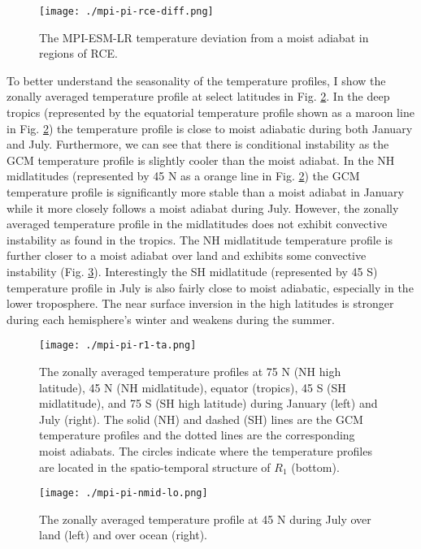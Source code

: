 \documentclass[11pt]{article}
\begin{document}
\begin{figure}[htbp]
\centering
\texttt{[image: ./mpi-pi-rce-diff.png]}
\caption{\label{fig:orgf8b1242}The MPI-ESM-LR temperature deviation from a moist adiabat in regions of RCE.}
\end{figure}

To better understand the seasonality of the temperature profiles, I show the zonally averaged temperature profile at select latitudes in Fig. \ref{fig:orgbce9cd6}. In the deep tropics (represented by the equatorial temperature profile shown as a maroon line in Fig. \ref{fig:orgbce9cd6}) the temperature profile is close to moist adiabatic during both January and July. Furthermore, we can see that there is conditional instability as the GCM temperature profile is slightly cooler than the moist adiabat. In the NH midlatitudes (represented by 45 N as a orange line in Fig. \ref{fig:orgbce9cd6}) the GCM temperature profile is significantly more stable than a moist adiabat in January while it more closely follows a moist adiabat during July. However, the zonally averaged temperature profile in the midlatitudes does not exhibit convective instability as found in the tropics. The NH midlatitude temperature profile is further closer to a moist adiabat over land and exhibits some convective instability (Fig. \ref{fig:org65f7c1f}). Interestingly the SH midlatitude (represented by 45 S) temperature profile in July is also fairly close to moist adiabatic, especially in the lower troposphere. The near surface inversion in the high latitudes is stronger during each hemisphere's winter and weakens during the summer.

\begin{figure}[htbp]
\centering
\texttt{[image: ./mpi-pi-r1-ta.png]}
\caption{\label{fig:orgbce9cd6}The zonally averaged temperature profiles at 75 N (NH high latitude), 45 N (NH midlatitude), equator (tropics), 45 S (SH midlatitude), and 75 S (SH high latitude) during January (left) and July (right). The solid (NH) and dashed (SH) lines are the GCM temperature profiles and the dotted lines are the corresponding moist adiabats. The circles indicate where the temperature profiles are located in the spatio-temporal structure of \(R_1\) (bottom).}
\end{figure}

\begin{figure}[htbp]
\centering
\texttt{[image: ./mpi-pi-nmid-lo.png]}
\caption{\label{fig:org65f7c1f}The zonally averaged temperature profile at 45 N during July over land (left) and over ocean (right).}
\end{figure}
\end{document}
